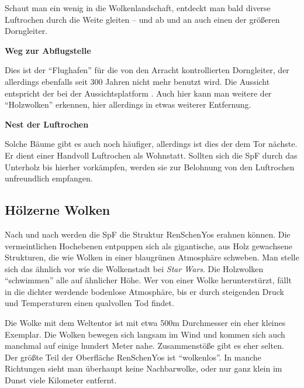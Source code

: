 \documentclass[
a4paper,
twoside,
DIV=calc,
BCOR=4mm,
fontsize=9pt,
twocolumn=on,
titlepage=on,
parskip=half
]{scrartcl}
\begin{document}
Schaut man ein wenig in die Wolkenlandschaft, entdeckt man bald
diverse Luftrochen durch die Weite gleiten -- und ab und an auch einen
der größeren Dorngleiter.

\textbf{ Weg zur Abflugstelle}


Dies ist der "`Flughafen"' für die von den Arracht kontrollierten
Dorngleiter, der allerdings ebenfalls seit 300 Jahren nicht mehr
benutzt wird. Die Aussicht entspricht der bei der Aussichtsplatform
. Auch hier kann man weitere der "`Holzwolken"' erkennen, hier
allerdings in etwas weiterer Entfernung.

\textbf{ Nest der Luftrochen}


Solche Bäume gibt es auch noch häufiger, allerdings ist dies der dem
Tor nächste. Er dient einer Handvoll Luftrochen als Wohnstatt. Sollten
sich die SpF durch das Unterholz bis hierher vorkämpfen, werden sie
zur Belohnung von den Luftrochen unfreundlich empfangen.

\subsection{Hölzerne Wolken}
\label{holzwolken}

Nach und nach werden die SpF die Struktur RenSchenYos erahnen
können. Die vermeintlichen Hochebenen entpuppen sich als gigantische,
aus Holz gewachsene Strukturen, die wie Wolken in einer blaugrünen
Atmosphäre schweben. Man stelle sich das ähnlich vor wie die
Wolkenstadt bei \emph{Star Wars}. Die Holzwolken "`schwimmen"' alle
auf ähnlicher Höhe. Wer von einer Wolke herunterstürzt, fällt in die
dichter werdende bodenlose Atmosphäre, bis er durch steigenden Druck
und Temperaturen einen qualvollen Tod findet.

Die Wolke mit dem Weltentor ist mit etwa 500m Durchmesser ein eher
kleines Exemplar. Die Wolken bewegen sich langsam im Wind und kommen
sich auch manchmal auf einige hundert Meter nahe. Zusammenstöße gibt
es eher selten. Der größte Teil der Oberfläche RenSchenYos ist
"`wolkenlos"'. In manche Richtungen sieht man überhaupt keine
Nachbarwolke, oder nur ganz klein im Dunst viele Kilometer entfernt.
\end{document}
